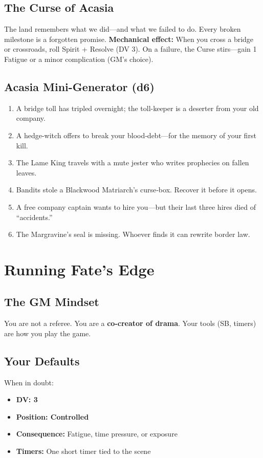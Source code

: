 \documentclass[10pt,twocolumn]{article} %
\begin{document}
\subsection{The Curse of Acasia}
The land remembers what we did---and what we failed to do. Every broken milestone is a forgotten promise.
\textbf{Mechanical effect:} When you cross a bridge or crossroads, roll Spirit + Resolve (DV 3). On a failure, the Curse stirs---gain 1 Fatigue or a minor complication (GM's choice).

\subsection{Acasia Mini-Generator (d6)}
\begin{enumerate}[leftmargin=*]
    \item A bridge toll has tripled overnight; the toll-keeper is a deserter from your old company.
    \item A hedge-witch offers to break your blood‑debt---for the memory of your first kill.
    \item The Lame King travels with a mute jester who writes prophecies on fallen leaves.
    \item Bandits stole a Blackwood Matriarch's curse‑box. Recover it before it opens.
    \item A free company captain wants to hire you---but their last three hires died of ``accidents.''
    \item The Margravine's seal is missing. Whoever finds it can rewrite border law.
\end{enumerate}

\section{Running Fate's Edge}

\subsection{The GM Mindset}
You are not a referee. You are a \textbf{co-creator of drama}. Your tools (SB, timers) are how you play the game.

\subsection{Your Defaults}
When in doubt:
\begin{itemize}[leftmargin=*]
    \item \textbf{DV: 3}
    \item \textbf{Position: Controlled}
    \item \textbf{Consequence:} Fatigue, time pressure, or exposure
    \item \textbf{Timers:} One short timer tied to the scene
\end{itemize}
\end{document}
